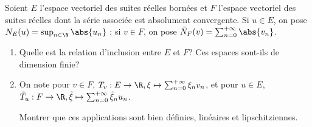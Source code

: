 \begin{enonce}
\begin{exercise}[ID={RMS126 E764},subtitle={Centrale PSI 2015},tags={}]
Soient $E$ l'espace vectoriel des suites réelles bornées et $F$ l'espace vectoriel des suites réelles dont la série associée est absolument convergente.
Si $u\in E$, on pose $N_E(u)=\sup_{n\in\N}\abs{u_n}$ ;
si $v\in F$, on pose $\tilde N_F(v) = \sum_{n=0}^{+\infty}\abs{v_n}$.
\begin{enumerate}
  \item Quelle est la relation d'inclusion entre $E$ et $F$?
    Ces espaces sont-ils de dimension finie?

  \item On note pour $v\in F$, $T_v:E\to \R, \xi\mapsto\sum_{n=0}^{+\infty} \xi_n v_n$,
    et pour $u\in E$, $\tilde T_u : F\to\R, \tilde\xi\mapsto\sum_{n=0}^{+\infty} \tilde\xi_n u_n$.

    Montrer que ces applications sont bien définies, linéaires et lipschitziennes.
\end{enumerate}
\end{exercise}
\begin{solution}
\end{solution}
\end{enonce}
